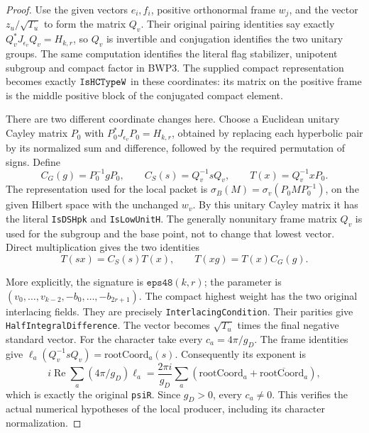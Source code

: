 \documentclass[11pt,a4paper]{article}
\numberwithin{equation}{section}
\theoremstyle{remark}\newtheorem{remark}[theorem]{Remark}
\begin{document}
\begin{proof}
Use the given vectors \(e_i,f_i\), positive orthonormal frame
\(w_j\), and the vector \(z_u/\sqrt{T_u}\) to form the
matrix \(Q_v\).  Their original pairing identities say exactly
\(Q_v^*J_{\epsilon_v}Q_v=H_{k,r}\), so \(Q_v\) is
invertible and conjugation identifies the two unitary groups.
The same computation identifies the literal flag stabilizer,
unipotent subgroup and compact factor in BWP3.  The supplied compact
representation becomes exactly \(\texttt{Is\allowbreak HCType\allowbreak W}\) in these
coordinates: its matrix on the positive frame is the middle positive
block of the conjugated compact element.

There are two different coordinate changes here.  Choose a
Euclidean unitary Cayley matrix \(P_0\) with
\(P_0^*J_{\epsilon_v}P_0=H_{k,r}\), obtained by replacing each
hyperbolic pair by its normalized sum and difference, followed by
the required permutation of signs.  Define
\[
 C_G(g)=P_0^{-1}gP_0,\qquad C_S(s)=Q_v^{-1}sQ_v,
 \qquad T(x)=Q_v^{-1}xP_0.
 \tag{BWP.28}
\]
The representation used for the local packet is
\(\sigma_B(M)=\sigma_v(P_0MP_0^{-1})\), on the given Hilbert
space with the unchanged \(w_v\).  By this unitary Cayley matrix
it has the literal \texttt{Is\allowbreak DSHpk} and \texttt{Is\allowbreak Low\allowbreak Unit\allowbreak H}.
The generally nonunitary frame matrix \(Q_v\) is used for the
subgroup and the base point, not to change that lowest vector.
Direct multiplication gives the two identities
\[
 T(sx)=C_S(s)T(x),\qquad T(xg)=T(x)C_G(g).
 \tag{BWP.29}
\]

More explicitly, the signature is \(\texttt{eps48}(k,r)\);
the parameter is \((v_0,\ldots,v_{k-2},-b_0,\ldots,-b_{2r+1})\).
The compact highest weight has the two original interlacing fields.
They are precisely \texttt{Interlacing\allowbreak Condition}.  Their parities
give \texttt{Half\allowbreak Integral\allowbreak Difference}.  The vector becomes
\(\sqrt{T_u}\) times the final negative standard vector.
For the character take every \(c_a=4\pi/g_D\).
The frame identities give
\(\ell_a(Q_v^{-1}sQ_v)=\mathrm{rootCoord}_a(s)\).
Consequently its exponent is
\[
 i\operatorname{Re}\sum_a(4\pi/g_D)\ell_a
 =\frac{2\pi i}{g_D}\sum_a
       (\mathrm{rootCoord}_a+\overline{\mathrm{rootCoord}_a}),
\]
which is exactly the original \texttt{psi\allowbreak R}.  Since \(g_D>0\),
every \(c_a\ne0\).  This verifies the actual numerical hypotheses
of the local producer, including its character normalization.


\end{proof}
\end{document}
